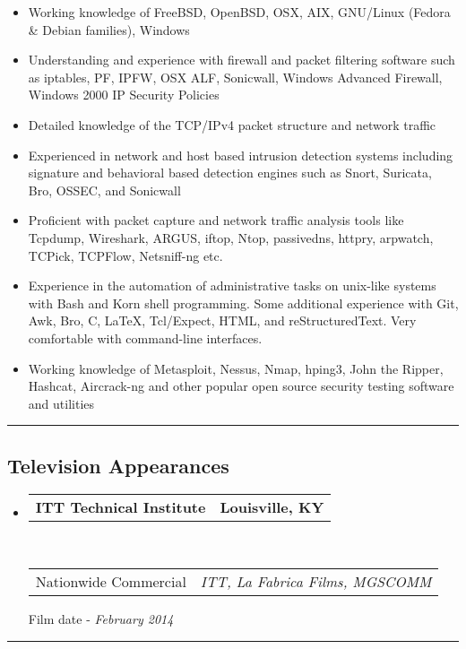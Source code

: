 \documentclass[10pt,letterpaper]{article}
\makeatletter
\newcommand{\headerrow}[2]
{\begin{tabular*}{\linewidth}{l@{\extracolsep{\fill}}r}
	#1 &
	#2 \\
\end{tabular*}}
\makeatother
\begin{document}
\begin{itemize}
	\parskip=0.1em

	\item Working knowledge of FreeBSD, OpenBSD, OSX, AIX, GNU/Linux (Fedora \& Debian families), Windows
	\item Understanding and experience with firewall and packet filtering software such as iptables, PF, IPFW, OSX ALF, Sonicwall, Windows Advanced Firewall, Windows 2000 IP Security Policies
	\item Detailed knowledge of the TCP/IPv4 packet structure and network traffic
	\item Experienced in network and host based intrusion detection systems
including signature and behavioral based detection engines such as Snort, Suricata, Bro, OSSEC, and Sonicwall
	\item Proficient with packet capture and network traffic analysis tools like Tcpdump, Wireshark, ARGUS, iftop, Ntop, passivedns, httpry, arpwatch, TCPick, TCPFlow, Netsniff-ng etc.
	\item Experience in the automation of administrative tasks on unix-like
systems with Bash and Korn shell programming. Some additional experience with Git, Awk, Bro, C, \LaTeX, Tcl/Expect, HTML, and reStructuredText. Very comfortable with command-line interfaces.
	\item Working knowledge of Metasploit, Nessus, Nmap, hping3, John the Ripper, Hashcat, Aircrack-ng and other popular open source security testing software and utilities
\end{itemize}

\newpage

\hrule
\vspace{-0.4em}
\subsection*{Television Appearances}

\begin{itemize}
	\parskip=0.1em

	\item
	\headerrow
		{\textbf{ITT Technical Institute}}
		{\textbf{Louisville, KY}}
	\\
	\headerrow
		{Nationwide Commercial}
		{\emph{ITT, La Fabrica Films, MGSCOMM}}
		{Film date - \emph{February 2014}}
\end{itemize}

\hrule
\vspace{-0.4em}
\end{document}

